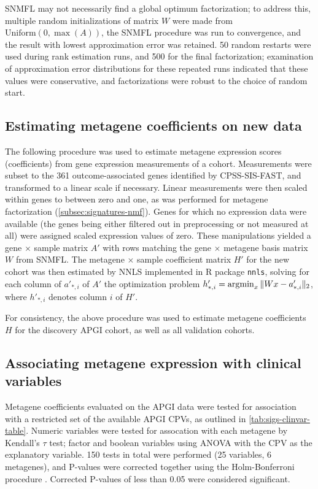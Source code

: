 \documentclass[dissertation.tex]{subfiles}
\begin{document}
\gls{SNMFL} may not necessarily find a global optimum factorization; to address this, multiple random initializations of matrix $W$ were made from $\text{Uniform}(0, \max(A))$, the \gls{SNMFL} procedure was run to convergence, and the result with lowest approximation error was retained.  50 random restarts were used during rank estimation runs, and 500 for the final factorization; examination of approximation error distributions for these repeated runs indicated that these values were conservative, and factorizations were robust to the choice of random start.

\subsection{Estimating metagene coefficients on new data}
\label{subsec:sigs-metagene-est}
The following procedure was used to estimate metagene expression scores (coefficients) from gene expression measurements of a cohort.  Measurements were subset to the 361 outcome-associated genes identified by \gls{CPSS}-\gls{SIS}-\gls{FAST}, and transformed to a linear scale if necessary.  Linear measurements were then scaled within genes to between zero and one, as was performed for metagene factorization (\cref{subsec:signatures-nmf}).  Genes for which no expression data were available (the genes being either filtered out in preprocessing or not measured at all) were assigned scaled expression values of zero.  These manipulations yielded a gene $\times$ sample matrix $A'$ with rows matching the gene $\times$ metagene basis matrix $W$ from \gls{SNMFL}.  The metagene $\times$ sample coefficient matrix $H'$ for the new cohort was then estimated by \gls{NNLS} implemented in R package \texttt{nnls}, solving for each column of $a'_{*,i}$ of $A'$ the optimization problem ${h'_{*,i}} = \operatorname*{\arg\!\min}_x \| W x - a'_{*,i} \|_2$, where $h'_{*,i}$ denotes column $i$ of $H'$.

For consistency, the above procedure was used to estimate metagene coefficients $H$ for the discovery \gls{APGI} cohort, as well as all validation cohorts.

\subsection{Associating metagene expression with clinical variables}
Metagene coefficients evaluated on the \gls{APGI} data were tested for association with a restricted set of the available \gls{APGI} \glspl{CPV}, as outlined in \cref{tab:sigs-clinvar-table}.  Numeric variables were tested for assocation with each metagene by Kendall's $\tau$ test; factor and boolean variables using ANOVA with the \gls{CPV} as the explanatory variable.  150 tests in total were performed (25 variables, 6 metagenes), and P-values were corrected together using the Holm-Bonferroni procedure \cite{Holm1979}.  Corrected P-values of less than 0.05 were considered significant.
\end{document}
